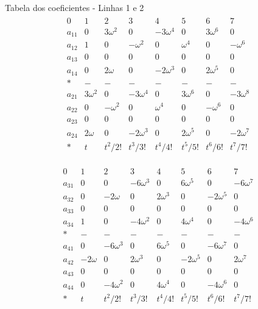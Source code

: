 \documentclass{beamer}
\begin{document}
\begin{frame}{Tabela dos coeficientes - Linhas 1 e 2}
  \begin{gather*}
    \begin{array}{c||c|c|c|c|c|c|c|}
      0 & 1 & 2 & 3 & 4 & 5 & 6 & 7 \\ \hline
      a_{11}&0 &3\omega^2 & 0& -3\omega^4& 0 &3\omega^6& 0 \\ 
      a_{12}& 1& 0& -\omega^2&0 & \omega^4&0 & -\omega^6 \\ 
      a_{13}& 0& 0& 0&0 &0 &0 & 0\\ 
      a_{14}& 0&2\omega &0 &-2\omega^3 &0 & 2\omega^5& 0\\ 
      *& -& -&- & -& -& -& - \\ 
      a_{21}& 3\omega^2& 0 &-3\omega^4 & 0& 3\omega^6 &0 & -3\omega^8 \\
      a_{22}& 0&-\omega^2 & 0 &\omega^4 & 0& -\omega^6& 0 \\ 
      a_{23}& 0 &0 &0 &0 &0 &0 &0  \\ 
      a_{24}&2\omega &0 &-2\omega^3 &0 &2\omega^5 &0 &-2\omega^7  \\ \hline
      * & t & t^2/2! & t^3/3!& t^4/4! & t^5/5! &t^6/6! & t^7/7! 
    \end{array}
  \end{gather*}
\end{frame}

\begin{frame}
  \begin{gather*}
    \begin{array}{c||c|c|c|c|c|c|c|}
      0 & 1 & 2 & 3 & 4 & 5 & 6 & 7 \\ \hline
      a_{31}&0 & 0 & -6\omega^3& 0 &6\omega^5 & 0& -6\omega^7 \\ 
      a_{32}& 0& -2\omega& 0& 2\omega^3&0 & -2\omega^5& 0  \\ 
      a_{33}&0 & 0& 0& 0& 0& 0& 0  \\ 
      a_{34}&1 & 0& -4\omega^2&0 &4\omega^4 & 0 & -4\omega^6\\ 
      *& -& -&- & -& -&- & - \\ 
      a_{41}& 0& -6\omega^3& 0 & 6\omega^5&0 &-6\omega^7 & 0 \\
      a_{42}&-2\omega &0 &2\omega^3 &0 & -2\omega^5& 0& 2\omega^7\\ 
      a_{43}&0 &0 & 0& 0& 0& 0& 0 \\ 
      a_{44}& 0&-4\omega^2 &0 &4\omega^4 & 0&-4\omega^6 &0 \\ \hline 
      * & t & t^2/2! & t^3/3!& t^4/4! & t^5/5! &t^6/6! & t^7/7!  
    \end{array}
  \end{gather*}
\end{frame}
\end{document}
